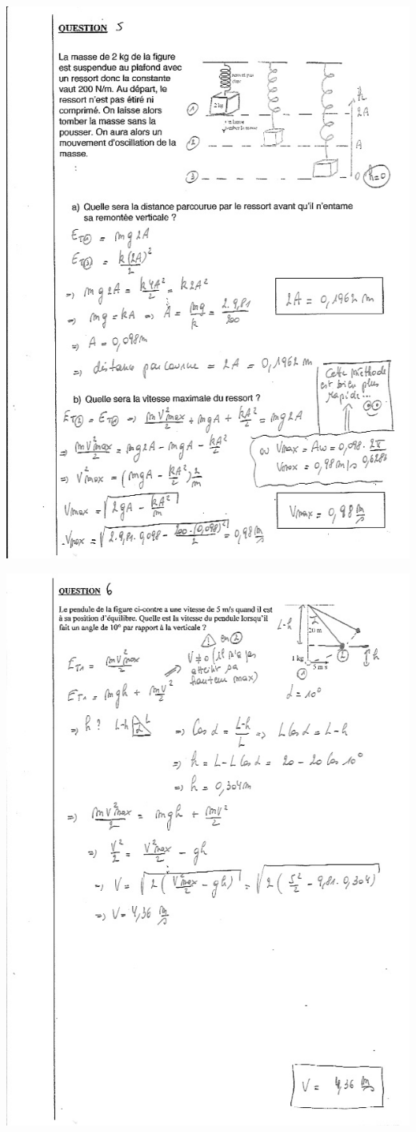  \includegraphics[width=15cm]{COURS2EnergieOHEXERCRESOL-img/COURS2EnergieOHEXERCRESOL-img013.png} 

 \includegraphics[width=15cm]{COURS2EnergieOHEXERCRESOL-img/COURS2EnergieOHEXERCRESOL-img014.png} 

